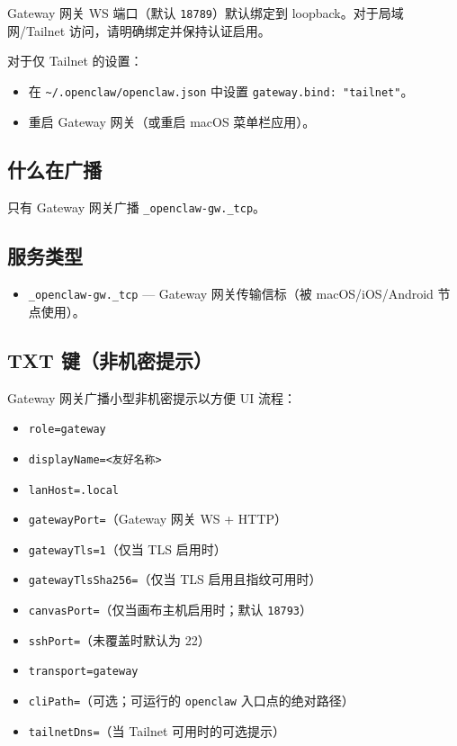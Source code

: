 Gateway 网关 WS 端口（默认 \texttt{18789}）默认绑定到 loopback。对于局域网/Tailnet
访问，请明确绑定并保持认证启用。

对于仅 Tailnet 的设置：

\begin{itemize}
  \item 在 \texttt{\textasciitilde{}/.openclaw/openclaw.json} 中设置 \texttt{gateway.bind: "tailnet"}。
  \item 重启 Gateway 网关（或重启 macOS 菜单栏应用）。
\end{itemize}


\subsection{什么在广播}


只有 Gateway 网关广播 \texttt{\_openclaw-gw.\_tcp}。

\subsection{服务类型}


\begin{itemize}
  \item \texttt{\_openclaw-gw.\_tcp} — Gateway 网关传输信标（被 macOS/iOS/Android 节点使用）。
\end{itemize}


\subsection{TXT 键（非机密提示）}


Gateway 网关广播小型非机密提示以方便 UI 流程：

\begin{itemize}
  \item \texttt{role=gateway}
  \item \texttt{displayName=<友好名称>}
  \item \texttt{lanHost=.local}
  \item \texttt{gatewayPort=}（Gateway 网关 WS + HTTP）
  \item \texttt{gatewayTls=1}（仅当 TLS 启用时）
  \item \texttt{gatewayTlsSha256=}（仅当 TLS 启用且指纹可用时）
  \item \texttt{canvasPort=}（仅当画布主机启用时；默认 \texttt{18793}）
  \item \texttt{sshPort=}（未覆盖时默认为 22）
  \item \texttt{transport=gateway}
  \item \texttt{cliPath=}（可选；可运行的 \texttt{openclaw} 入口点的绝对路径）
  \item \texttt{tailnetDns=}（当 Tailnet 可用时的可选提示）
\end{itemize}


